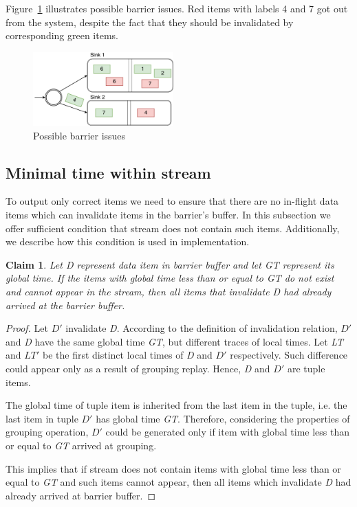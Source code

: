 Figure~\ref{invalidation-problems-figure} illustrates possible barrier issues. Red items with labels 4 and 7 got out from the system, despite the fact that they should be invalidated by corresponding green items. 

\begin{figure}[htbp]
  \centering
  \includegraphics[width=0.48\textwidth]{pics/invalidation_problems}
  \caption{Possible barrier issues}
  \label {invalidation-problems-figure}
\end{figure}

\subsection{Minimal time within stream}
To output only correct items we need to ensure that there are no in-flight data items which can invalidate items in the barrier's buffer. In this subsection we offer sufficient condition that stream does not contain such items. Additionally, we describe how this condition is used in implementation.

\newtheorem{minimal-time-claim}{Claim}

\begin{minimal-time-claim}
Let {\it D} represent data item in barrier buffer and let {\it GT} represent its global time. If the items with global time less than or equal to {\it GT} do not exist and cannot appear in the stream, then all items that invalidate {\it D} had already arrived at the barrier buffer.
\end{minimal-time-claim}

\begin{proof}
Let {\it $D\prime$} invalidate {\it D}. According to the definition of invalidation relation, {\it $D\prime$} and {\it D} have the same global time {\it GT}, but different traces of local times. Let {\it LT} and {\it $LT\prime$} be the first distinct local times of {\it D} and {\it $D\prime$} respectively. Such difference could appear only as a result of grouping replay. Hence, {\it D} and {\it $D\prime$} are tuple items.

The global time of tuple item is inherited from the last item in the tuple, i.e. the last item in tuple {\it $D\prime$} has global time {\it GT}. Therefore, considering the properties of grouping operation, {\it $D\prime$} could be generated only if item with global time less than or equal to {\it GT} arrived at grouping. 

This implies that if stream does not contain items with global time less than or equal to {\it GT} and such items cannot appear, then all items which invalidate {\it D} had already arrived at barrier buffer. 
\end{proof}

